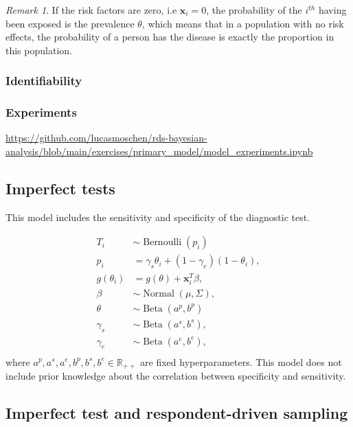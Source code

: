 \documentclass[a4paper, notitlepage, 11pt]{article}
\newcommand{\R}{\mathbb{R}}
\newcommand{\x}{\boldsymbol{x}}
\newcommand{\N}{\operatorname{Normal}}
\newcommand{\betadist}{\operatorname{Beta}}
\newcommand{\bern}{\operatorname{Bernoulli}}
\theoremstyle{definition}
\theoremstyle{remark}
\newtheorem*{remark}{Remark}
\begin{document}
\begin{remark}
  If the risk factors are zero, i.e $\x_i = 0$, the probability of the
  $i^{th}$ having been exposed is the prevalence $\theta$, which means that in
  a population with no risk effects, the probability of a person has the
  disease is exactly the proportion in this population. 
\end{remark}

\subsubsection{Identifiability}

\subsubsection{Experiments}

\url{https://github.com/lucasmoschen/rds-bayesian-analysis/blob/main/exercises/primary_model/model_experiments.ipynb}

\subsection{Imperfect tests}

This model includes the sensitivity and specificity of the diagnostic test. 

\begin{equation}
  \begin{aligned}
    T_i &\sim \bern(p_i) \\
    p_i &= \gamma_s\theta_i + (1-\gamma_e)(1 - \theta_i),  \\
    g(\theta_i) &= g(\theta) + \x_i^T\beta,  \\
    \beta &\sim \N(\mu, \Sigma), \\ 
    \theta &\sim \betadist(a^p, b^p) \\
    \gamma_s &\sim \betadist(a^s, b^s), \\
    \gamma_e &\sim \betadist(a^e, b^e), \\    
  \end{aligned}  
\end{equation}
where $a^p, a^s, a^e, b^p, b^s, b^e \in \R_{++}$ are fixed hyperparameters.
This model does not include prior knowledge about the correlation between
specificity and sensitivity. 

\subsection{Imperfect test and respondent-driven sampling}
\end{document}
